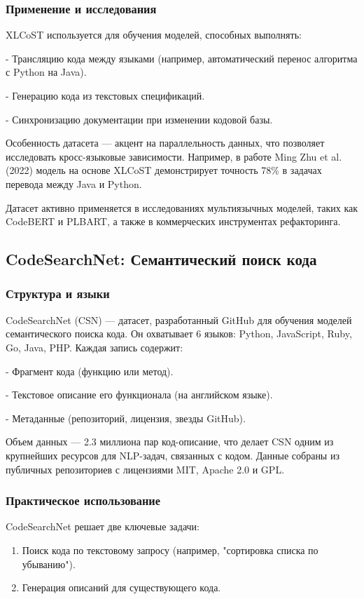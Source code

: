 \documentclass[14pt]{article}
\theoremstyle{definition}
\begin{document}
\subsubsection{Применение и исследования}
XLCoST используется для обучения моделей, способных выполнять:

    
- Трансляцию кода между языками (например, автоматический перенос алгоритма с Python на Java).
    
- Генерацию кода из текстовых спецификаций.
    
- Синхронизацию документации при изменении кодовой базы.


Особенность датасета — акцент на параллельность данных, что позволяет исследовать кросс-языковые зависимости. Например, в работе Ming Zhu et al. (2022) модель на основе XLCoST демонстрирует точность 78\% в задачах перевода между Java и Python.

Датасет активно применяется в исследованиях мультиязычных моделей, таких как CodeBERT и PLBART, а также в коммерческих инструментах рефакторинга.



\newpage

\subsection{CodeSearchNet: Семантический поиск кода}

\subsubsection{Структура и языки}
CodeSearchNet (CSN) — датасет, разработанный GitHub для обучения моделей семантического поиска кода. Он охватывает 6 языков: Python, JavaScript, Ruby, Go, Java, PHP. Каждая запись содержит:

    
- Фрагмент кода (функцию или метод).
    
- Текстовое описание его функционала (на английском языке).
    
- Метаданные (репозиторий, лицензия, звезды GitHub).


Объем данных — 2.3 миллиона пар код-описание, что делает CSN одним из крупнейших ресурсов для NLP-задач, связанных с кодом. Данные собраны из публичных репозиториев с лицензиями MIT, Apache 2.0 и GPL.

\subsubsection{Практическое использование}
CodeSearchNet решает две ключевые задачи:
\begin{enumerate}
    \item Поиск кода по текстовому запросу (например, "сортировка списка по убыванию").
    \item Генерация описаний для существующего кода.
\end{enumerate}
\end{document}
